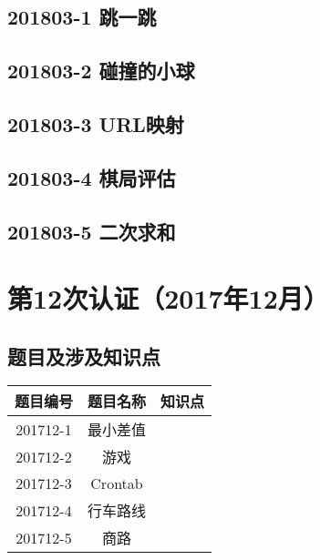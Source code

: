 \documentclass[cn,10pt,math=newtx,citestyle=gb7714-2015,bibstyle=gb7714-2015]{elegantbook}
\newif\ifonlyanalyze %
\begin{document}
\newpage
\section{201803-1 跳一跳}
\ifonlyanalyze
\else
    
\fi


\newpage
\section{201803-2 碰撞的小球}
\ifonlyanalyze
\else
    
\fi


\newpage
\section{201803-3 URL映射}
\ifonlyanalyze
\else
    
\fi


\newpage
\section{201803-4 棋局评估}
\ifonlyanalyze
\else
    
\fi


\newpage
\section{201803-5 二次求和}
\ifonlyanalyze
\else
    
\fi



\chapter{第12次认证（2017年12月）}

\section{题目及涉及知识点}

\begin{table}[htbp]
    \centering
    \begin{tabular}{ccc}
        \toprule
        题目编号 & 题目名称 & 知识点 \\
        \midrule
        201712-1 & 最小差值 &        \\
        201712-2 & 游戏     &        \\
        201712-3 & Crontab  &        \\
        201712-4 & 行车路线 &        \\
        201712-5 & 商路     &        \\
        \bottomrule
    \end{tabular}
\end{table}
\end{document}
